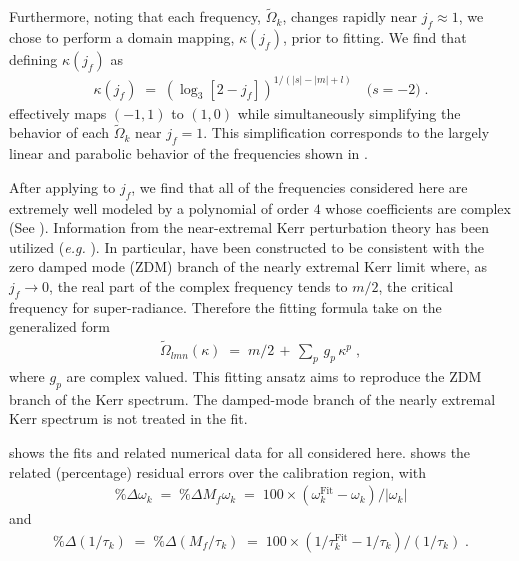\documentclass[twocolumn,prd,floatfix,preprintnumbers,a4paper,nofootinbib,superscriptaddress]{revtex4-1}
\newcommand{\CW}{\tilde{\Omega}}
\def\j{j_f}
\begin{document}
%
\par Furthermore, noting that each \qnm{} frequency, $\CW_k$, changes rapidly near $\j{} \approx 1$, we chose to perform a domain mapping, $\kappa(\j{})$, prior to fitting.
%
We find that defining $\kappa(\j{})$ as
%
\begin{align}
	\kappa(\j{}) \; = \; \left( \log_3 [ 2 - \j{}  ] \right)^{ 1/(|s| - |m| + l) } \quad \text{($s=-2$)} \; .
		\label{eq:jf_map}
\end{align}
%
effectively maps $(-1,1)$ to $(1,0)$ while simultaneously simplifying the behavior of each $\CW_k$ near $\j{}=1$.
%
This simplification corresponds to the largely linear and parabolic behavior of the \qnm{} frequencies shown in .
%
\par After applying  to $\j{}$, we find that all of the \qnm{} frequencies considered here are extremely well modeled by a polynomial of order $4$ whose coefficients are complex (See ).
%
Information from the near-extremal Kerr perturbation theory has been utilized (\textit{e.g.} \cite{Dias:2015wqa,Zimmerman:2015rua,Zimmerman:2015trm,Yang:2012pj}).
%
In particular,  have been constructed to be consistent with the zero damped mode (ZDM) branch of the nearly extremal Kerr limit where, as $\j{} \rightarrow 0$, the real part of the complex \qnm{} frequency tends to $m/2$, the critical frequency for super-radiance.
%
Therefore the fitting formula take on the generalized form
%
\begin{align}
	\label{eq:cw_ansatz}
	\CW_{lmn}(\kappa) \; = \; m/2 \, + \, \sum_{p} \, g_p \, \kappa^p \; ,
\end{align}
%
where $g_p$ are complex valued.
%
This fitting ansatz aims to reproduce the ZDM branch of the Kerr spectrum.
%
The damped-mode branch of the nearly extremal Kerr spectrum is not treated in the fit.
%
\begin{widetext}
	\red{
		
	}
\end{widetext}
%
\par {} shows the fits and related numerical data for all  considered here.
%
 shows the related (percentage) residual errors over the calibration region, with
%
\begin{align}
	\%\Delta \omega_k \; = \; \%\Delta M_f \omega_k \; = \; 100 \times ( \omega^{\mathrm{Fit}}_k - \omega_k ) / |\omega_k|
	\label{eq:percw}
\end{align}
%
and
%
\begin{align}
	\%\Delta (1/\tau_k) \; = \; \%\Delta (M_f / \tau_k) \; = \; 100 \times ( 1/\tau^{\mathrm{Fit}}_k - 1/\tau_k ) / (1/\tau_k) \; .
	\label{eq:perctau}
\end{align}
\end{document}
